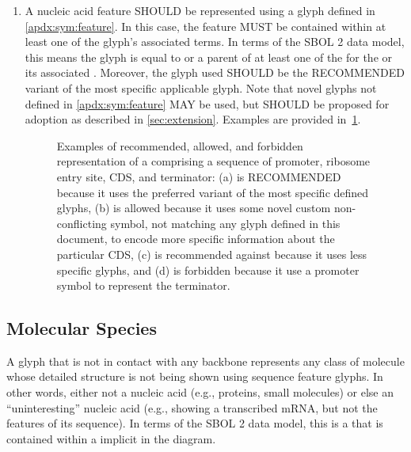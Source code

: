 \begin{enumerate}
\item A nucleic acid feature SHOULD be represented using a glyph defined in \ref{apdx:sym:feature}.  In this case, the feature MUST be contained within at least one of the glyph's associated terms.
In terms of the SBOL 2 data model, this means the glyph is equal to or a parent of at least one of the  for the  or its associated .
	Moreover, the glyph used SHOULD be the RECOMMENDED variant of the most specific applicable glyph.  Note that novel glyphs not defined in \ref{apdx:sym:feature} MAY be used, but SHOULD be proposed for adoption as described in \ref{sec:extension}.
	Examples are provided in~\ref{exa:2f}.
	\begin{figure}[h!]
	\centering
	\caption{Examples of recommended, allowed, and forbidden representation of a  comprising a sequence of promoter, ribosome entry site, CDS, and terminator: (a) is RECOMMENDED because it uses the preferred variant of the most specific defined glyphs, (b) is allowed because it uses some novel custom non-conflicting symbol, not matching any glyph defined in this document, to encode more specific information about the particular CDS, (c) is recommended against because it uses less specific glyphs, and (d) is forbidden because it use a promoter symbol to represent the terminator.}
	\label{exa:2f}
	\end{figure}
\end{enumerate}


\subsection{Molecular Species}
A glyph that is not in contact with any backbone represents any class of molecule whose detailed structure is not being shown using sequence feature glyphs.
In other words, either not a nucleic acid (e.g., proteins, small molecules) or else an ``uninteresting'' nucleic acid (e.g., showing a transcribed mRNA, but not the features of its sequence).
In terms of the SBOL 2 data model, this is a  that is contained within a  implicit in the diagram.

